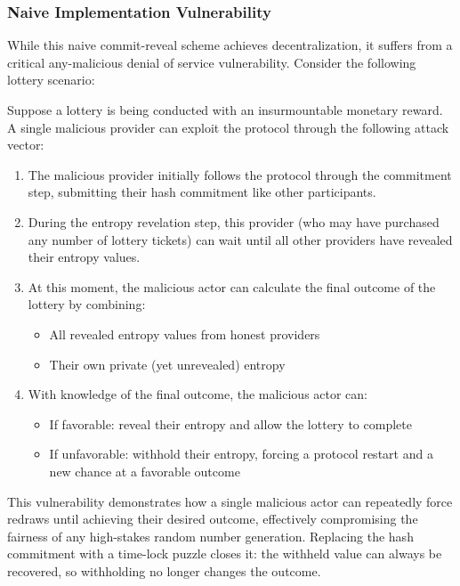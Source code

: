 \subsubsection{Naive Implementation Vulnerability}\label{sec:commit_reveal_vulnerability}

While this naive commit-reveal scheme achieves decentralization, it suffers from a critical any-malicious denial of service vulnerability. Consider the following lottery scenario:

Suppose a lottery is being conducted with an insurmountable monetary reward. A single malicious provider can exploit the protocol through the following attack vector:

\begin{enumerate}
    \item The malicious provider initially follows the protocol through the commitment step, submitting their hash commitment like other participants.

    \item During the entropy revelation step, this provider (who may have purchased any number of lottery tickets) can wait until all other providers have revealed their entropy values.

    \item At this moment, the malicious actor can calculate the final outcome of the lottery by combining:
    \begin{itemize}
        \item All revealed entropy values from honest providers
        \item Their own private (yet unrevealed) entropy
    \end{itemize}

    \item With knowledge of the final outcome, the malicious actor can:
    \begin{itemize}
        \item If favorable: reveal their entropy and allow the lottery to complete
        \item If unfavorable: withhold their entropy, forcing a protocol restart and a new chance at a favorable outcome
    \end{itemize}
\end{enumerate}

This vulnerability demonstrates how a single malicious actor can repeatedly force redraws until achieving their desired outcome, effectively compromising the fairness of any high-stakes random number generation. Replacing the hash commitment with a time-lock puzzle closes it: the withheld value can always be recovered, so withholding no longer changes the outcome.

